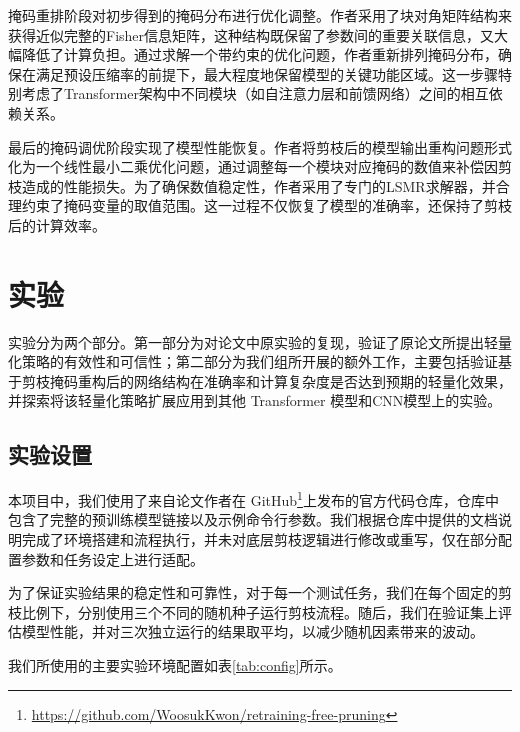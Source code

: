 \documentclass[UTF8,openany]{ctexbook}
\begin{document}
掩码重排阶段对初步得到的掩码分布进行优化调整。作者采用了块对角矩阵结构来获得近似完整的Fisher信息矩阵，这种结构既保留了参数间的重要关联信息，又大幅降低了计算负担。通过求解一个带约束的优化问题，作者重新排列掩码分布，确保在满足预设压缩率的前提下，最大程度地保留模型的关键功能区域。这一步骤特别考虑了Transformer架构中不同模块（如自注意力层和前馈网络）之间的相互依赖关系。

最后的掩码调优阶段实现了模型性能恢复。作者将剪枝后的模型输出重构问题形式化为一个线性最小二乘优化问题，通过调整每一个模块对应掩码的数值来补偿因剪枝造成的性能损失。为了确保数值稳定性，作者采用了专门的LSMR求解器，并合理约束了掩码变量的取值范围。这一过程不仅恢复了模型的准确率，还保持了剪枝后的计算效率。

\chapter{实验}

实验分为两个部分。第一部分为对论文中原实验的复现，验证了原论文所提出轻量化策略的有效性和可信性；第二部分为我们组所开展的额外工作，主要包括验证基于剪枝掩码重构后的网络结构在准确率和计算复杂度是否达到预期的轻量化效果，并探索将该轻量化策略扩展应用到其他 Transformer 模型和CNN模型上的实验。

\section{实验设置}

本项目中，我们使用了来自论文作者在 GitHub\footnote{\url{https://github.com/WoosukKwon/retraining-free-pruning}}上发布的官方代码仓库，仓库中包含了完整的预训练模型链接以及示例命令行参数。我们根据仓库中提供的文档说明完成了环境搭建和流程执行，并未对底层剪枝逻辑进行修改或重写，仅在部分配置参数和任务设定上进行适配。

为了保证实验结果的稳定性和可靠性，对于每一个测试任务，我们在每个固定的剪枝比例下，分别使用三个不同的随机种子运行剪枝流程。随后，我们在验证集上评估模型性能，并对三次独立运行的结果取平均，以减少随机因素带来的波动。

我们所使用的主要实验环境配置如表\ref{tab:config}所示。
\end{document}
